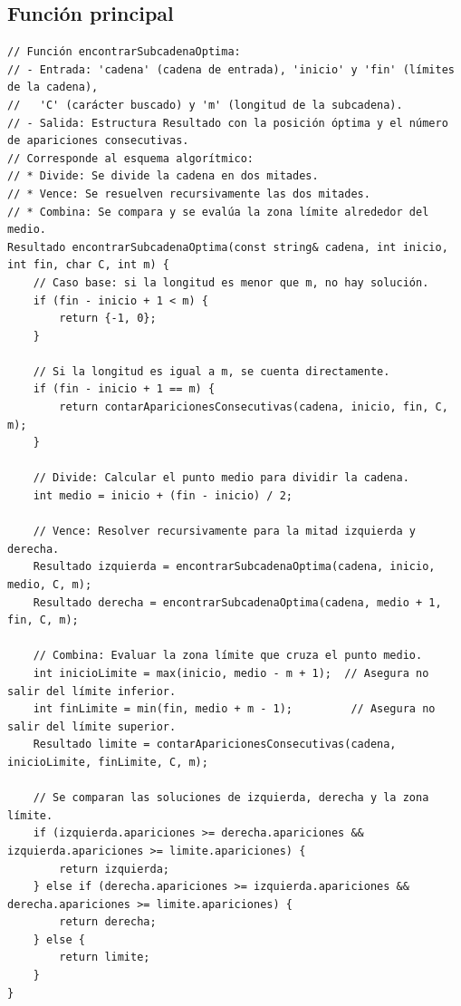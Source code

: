 \documentclass[12pt,a4paper]{article}
\begin{document}
\subsection{Función principal}
\begin{lstlisting}[caption=Función encontrarSubcadenaOptima]
// Función encontrarSubcadenaOptima:
// - Entrada: 'cadena' (cadena de entrada), 'inicio' y 'fin' (límites de la cadena),
//   'C' (carácter buscado) y 'm' (longitud de la subcadena).
// - Salida: Estructura Resultado con la posición óptima y el número de apariciones consecutivas.
// Corresponde al esquema algorítmico: 
// * Divide: Se divide la cadena en dos mitades.
// * Vence: Se resuelven recursivamente las dos mitades.
// * Combina: Se compara y se evalúa la zona límite alrededor del medio.
Resultado encontrarSubcadenaOptima(const string& cadena, int inicio, int fin, char C, int m) {
    // Caso base: si la longitud es menor que m, no hay solución.
    if (fin - inicio + 1 < m) {
        return {-1, 0};
    }
    
    // Si la longitud es igual a m, se cuenta directamente.
    if (fin - inicio + 1 == m) {
        return contarAparicionesConsecutivas(cadena, inicio, fin, C, m);
    }
    
    // Divide: Calcular el punto medio para dividir la cadena.
    int medio = inicio + (fin - inicio) / 2;
    
    // Vence: Resolver recursivamente para la mitad izquierda y derecha.
    Resultado izquierda = encontrarSubcadenaOptima(cadena, inicio, medio, C, m);
    Resultado derecha = encontrarSubcadenaOptima(cadena, medio + 1, fin, C, m);
    
    // Combina: Evaluar la zona límite que cruza el punto medio.
    int inicioLimite = max(inicio, medio - m + 1);  // Asegura no salir del límite inferior.
    int finLimite = min(fin, medio + m - 1);         // Asegura no salir del límite superior.
    Resultado limite = contarAparicionesConsecutivas(cadena, inicioLimite, finLimite, C, m);
    
    // Se comparan las soluciones de izquierda, derecha y la zona límite.
    if (izquierda.apariciones >= derecha.apariciones && izquierda.apariciones >= limite.apariciones) {
        return izquierda;
    } else if (derecha.apariciones >= izquierda.apariciones && derecha.apariciones >= limite.apariciones) {
        return derecha;
    } else {
        return limite;
    }
}
\end{lstlisting}
\end{document}
